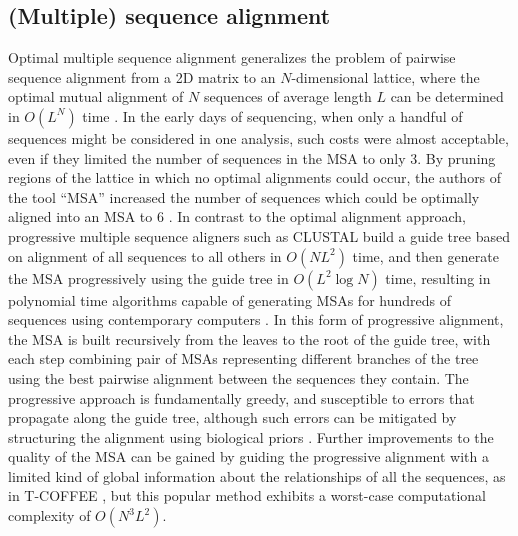 \documentclass[a4paper,12pt,numbered,oneside]{Classes/PhDThesisPSnPDF}
\begin{document}
\subsection{(Multiple) sequence alignment}
\label{sec:MSA}

Optimal multiple sequence alignment generalizes the problem of pairwise sequence alignment from a 2D matrix to an $N$-dimensional lattice, where the optimal mutual alignment of $N$ sequences of average length $L$ can be determined in $O(L^{N})$ time \cite{carrillo1988multiple}.
In the early days of sequencing, when only a handful of sequences might be considered in one analysis, such costs were almost acceptable, even if they limited the number of sequences in the MSA to only 3.
By pruning regions of the lattice in which no optimal alignments could occur, the authors of the tool ``MSA'' increased the number of sequences which could be optimally aligned into an MSA to 6 \cite{lipman1989tool}.
In contrast to the optimal alignment approach, progressive multiple sequence aligners such as CLUSTAL build a guide tree based on alignment of all sequences to all others in $O(NL^{2})$ time, and then generate the MSA progressively using the guide tree in $O(L^{2}\log N)$ time, resulting in polynomial time algorithms capable of generating MSAs for hundreds of sequences using contemporary computers \cite{higgins1988clustal}.
In this form of progressive alignment, the MSA is built recursively from the leaves to the root of the guide tree, with each step combining pair of MSAs representing different branches of the tree using the best pairwise alignment between the sequences they contain.
The progressive approach is fundamentally greedy, and susceptible to errors that propagate along the guide tree, although such errors can be mitigated by structuring the alignment using biological priors \cite{thompson1994clustal}.
Further improvements to the quality of the MSA can be gained by guiding the progressive alignment with a limited kind of global information about the relationships of all the sequences, as in T-COFFEE \cite{notredame2000t}, but this popular method exhibits a worst-case computational complexity of $O(N^{3}L^{2})$.
\end{document}
